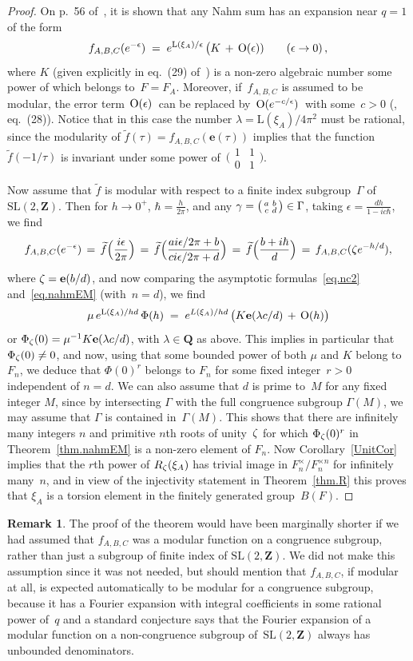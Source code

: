 \documentclass[12pt,reqno]{amsart}
\theoremstyle{definition}
\newtheorem{remark}[theorem]{Remark}
\newcommand{\changed}[1]{{#1}}
\def\be{\begin{equation}}
\def\ee{\end{equation}}
\def\+{\,+\,}
\def\={\;=\;}
\def\Q{\mathbf Q}   %
\def\Z{\mathbf Z}   %
\def\sm#1#2#3#4{\bigl(\begin{smallmatrix}#1&#2\\#3&#4\end{smallmatrix}\bigr)}
\def\tf{\widetilde f}
\def\BZ{\mathbf Z}
\def\BZ{\Z}
\def\G{\Gamma}
\def\L{\mathrm L}
\def\ep{\epsilon}
\def\SL{\mathrm{SL}}
\def\nn{n}
\def\e{\mathbf{e}}
\def\SL{\mathrm{SL}}
\def\G{\Gamma}
\begin{document}
\begin{proof}  
On p.~56 of~\cite{Zagier}, it is shown that any Nahm sum has an expansion 
near $q=1$ of the form
\be
\label{eq.nc2}
f_{A,B,C}(e^{-\ep}) \= e^{\L(\xi_A)/\ep}\,\bigl(K \+ \text O(\ep)) 
\qquad (\ep\to 0)\,, 
\ee
where $K$ (given explicitly in eq.~(29) of~\cite{Zagier}) is a non-zero
algebraic number some power of which belongs to~$F=F_A$.
\changed{Moreover, if~$f_{A,B,C}$ is assumed to be modular,
 the error term $\,\text O(\ep)\,$ can be} replaced by
$\,\text O(e^{-c/\ep})\,$ with 
some~$c>0$ 
(\cite{Zagier}, eq.~(28)).
Notice that in this case the number $\lambda=\L(\xi_A)/4\pi^2$ must be 
rational, since the modularity of $\tf(\tau)=f_{A,B,C}(\e(\tau))$ implies that
the function $\tf(-1/\tau)$ is invariant under some power of~$\sm1101$.

Now assume that $\tf$ is modular with respect to a finite index subgroup~$\G$ 
of $\SL(2,\BZ)$. Then for $h\to0^+$, $\hbar=\frac h{2\pi}$, and any 
$\g=\sm abcd\in\G$,
taking $\ep=\frac{dh}{1-ic\hbar}$, we find
$$
f_{A,B,C}(e^{-\ep}) \,=\, \tf\Bigl(\frac{i\ep}{2\pi}\Bigr) 
\,=\, \tf\Bigl(\frac{ai\ep/2\pi+b}{ci\ep/2\pi+d}\Bigr)
\,=\,\tf\Bigl(\frac{b+i\hbar}d\Bigr) \,=\, f_{A,B,C}(\z e^{-h/d}),
$$
where $\z=\e(b/d)$, and now comparing the asymptotic formulas~\eqref{eq.nc2} 
and~\eqref{eq.nahmEM} (with~$n=d$), we find
$$
\mu\,e^{\L(\xi_A)/hd}\,\Phi(h) \= e^{L(\xi_A)/hd}\,
\bigl(K \e(\lambda c/d)\+\text O(h)\bigr)
$$
or $\Phi_\z(0)=\mu\i K\e(\lambda c/d)$, with $\lambda\in\Q$ as above. This 
implies in particular that $\Phi_\zeta(0)\ne0$, and now, using that some bounded 
power of both $\mu$ and $K$ belong to~$F_\nn$, we deduce that $\Phi(0)^r$ 
belongs to $F_\nn$ for some fixed integer~$r>0$ independent of $n=d$. We can 
also assume that $d$ is prime to~$M$ for any fixed integer $M$, since by 
intersecting $\G$ with the full congruence subgroup $\G(M)$, we may assume 
that $\G$ is contained in~$\Gamma(M)$. This shows that there are infinitely 
many integers $\nn$ and primitive $\nn$th roots of unity~$\zeta$ for which
$\Phi_\zeta(0)^r$ in Theorem~\ref{thm.nahmEM} is a non-zero element of $F_\nn$. Now
Corollary~\ref{UnitCor} implies that the $r$th power of $R_\zeta(\xi_A)$ has 
trivial image in $F_\nn^\times/F_\nn^{\times\nn}$ for infinitely many~$\nn$, and in 
view of the injectivity statement in Theorem~\ref{thm.R} this proves that 
$\xi_A$ is a torsion element in the finitely generated group~$B(F)$.
\end{proof}

\begin{remark}
The proof of the theorem would have been marginally shorter if we had assumed 
that $f_{A,B,C}$ was a modular function on a congruence subgroup, rather than
just a subgroup of finite index of $\SL(2,\Z)$.  We did not make this 
assumption since it was not needed, but should mention that $f_{A,B,C}$, if 
modular at all, is expected automatically to be modular for a congruence 
subgroup, because it has a Fourier expansion with integral coefficients in 
some rational power of~$q$ and a standard conjecture says that the Fourier 
expansion of a modular function on a non-congruence subgroup of~$\SL(2,\Z)$ 
always has unbounded denominators.
\end{remark}
\end{document}
